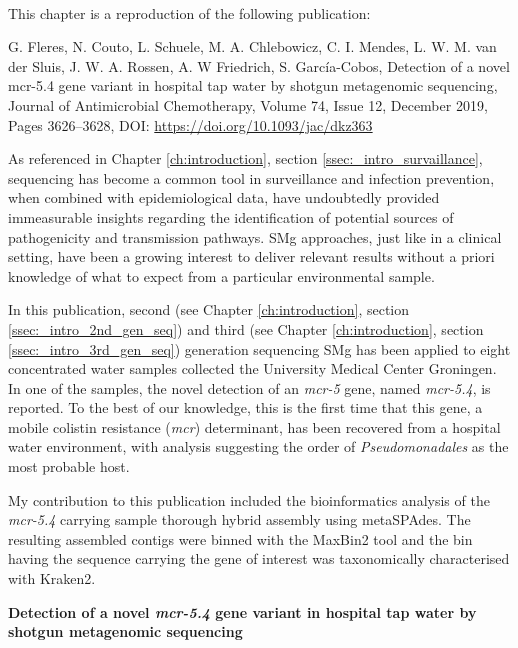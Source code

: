 \mbox{}\\
\vspace{8cm}

This chapter is a reproduction of the following publication:

G. Fleres, N. Couto, L. Schuele, M. A. Chlebowicz, C. I. Mendes, L. W. M. van der Sluis, J. W. A. Rossen, A. W Friedrich, S. García-Cobos, Detection of a novel mcr-5.4 gene variant in hospital tap water by shotgun metagenomic sequencing, Journal of Antimicrobial Chemotherapy, Volume 74, Issue 12, December 2019, Pages 3626–3628, DOI: \url{https://doi.org/10.1093/jac/dkz363}

As referenced in Chapter \ref{ch:introduction}, section \ref{ssec:_intro_survaillance}, sequencing has become a common tool in surveillance and infection prevention, when combined with epidemiological data, have undoubtedly provided immeasurable insights regarding the identification of potential sources of pathogenicity and transmission pathways. \ac{SMg} approaches, just like in a clinical setting, have been a growing interest to deliver relevant results without a priori knowledge of what to expect from a particular environmental sample. 

In this publication, second (see Chapter \ref{ch:introduction}, section \ref{ssec:_intro_2nd_gen_seq}) and third (see Chapter \ref{ch:introduction}, section \ref{ssec:_intro_3rd_gen_seq}) generation sequencing \ac{SMg} has been applied to eight concentrated water samples collected the University Medical Center Groningen. In one of the samples, the novel detection of an \textit{mcr-5} gene, named \textit{mcr-5.4}, is reported. To the best of our knowledge, this is the first time that this gene, a mobile colistin resistance (\textit{mcr}) determinant, has been recovered from a hospital water environment, with analysis suggesting the order of \textit{Pseudomonadales} as the most probable host. 

My contribution to this publication included the bioinformatics analysis of the \textit{mcr-5.4} carrying sample thorough hybrid assembly using metaSPAdes. The resulting assembled contigs were binned with the MaxBin2 tool and the bin having the sequence carrying the gene of interest was taxonomically characterised with Kraken2.


\cleardoublepage 

\begin{center}
\large
\textbf{Detection of a novel \textit{mcr-5.4} gene
variant in hospital tap water by
shotgun metagenomic sequencing}
\end{center}

